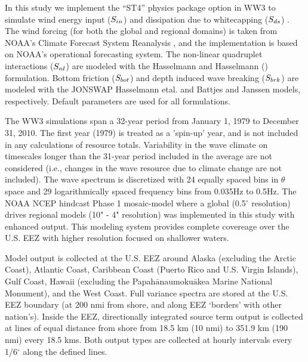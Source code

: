In this study we implement the ``ST4'' physics package option in WW3 to simulate wind energy input ($S_{ in }$) and dissipation due to whitecapping ($S_{ ds }$) \citep{ardhuinObservationSwellDissipation2009}.
The wind forcing (for both the global and regional domains) is taken from NOAA's Climate Forecast System Reanalysis \citep{sahaNCEPClimateForecast2010}, and the implementation is based on NOAA's operational forecasting system.
The non-linear quadruplet interactions ($S_{ nl }$) are modeled with the Hasselmann and Hasselmann (\citeyear{hasselmannComputationsParameterizationsNonlinear1985}) formulation.
Bottom friction ($S_{ bot }$) and depth induced wave breaking ($S_{ brk }$) are modeled with the JONSWAP Hasselmann etal. \citeyear{hasselmannMeasurementsWindwaveGrowth1973} and Battjes and Janssen \citeyear{battjesEnergyLossSetup1978} models, respectively.
Default parameters are used for all formulations. 

The WW3 simulations span a 32-year period from January 1, 1979 to December 31, 2010. The first year (1979) is treated as a 'spin-up' year, and is not included in any calculations of resource totals. Variability in the wave climate on timescales longer than the 31-year period included in the average are not considered (i.e., changes in the wave resource due to climate change are not included). The wave spectrum is discretized with 24 equally spaced bins in $\theta$ space and 29 logarithmically spaced frequency bins from 0.035Hz to 0.5Hz. The NOAA NCEP hindcast Phase 1 mosaic-model  where a global (0.5$^{\circ}$ resolution) drives regional models (10" - 4" resolution) was implemented in this study with enhanced output. This modeling system provides complete covereage over the U.S. EEZ with higher resolution focused on shallower waters.

Model output is collected at the U.S. EEZ around Alaska (excluding the Arctic Coast), Atlantic Coast, Caribbean Coast (Puerto Rico and U.S. Virgin Islands), Gulf Coast, Hawaii (excluding the Papah$\bar{\text{a}}$naumoku$\bar{\text{a}}$kea Marine National Monument), and the West Coast. Full variance spectra are stored at the U.S. EEZ boundary (at 200 nmi from shore, and along EEZ `borders' with other nation's). Inside the EEZ, directionally integrated source term output is collected at lines of equal distance from shore from 18.5 km (10 nmi) to 351.9 km (190 nmi) every 18.5 kms. Both output types are collected at hourly intervals every 1/6$^{\circ}$ along the defined lines.

